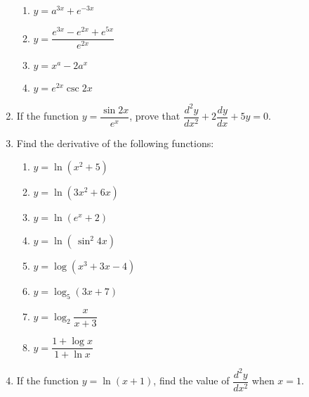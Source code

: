 \documentclass[12pt]{report}
\begin{document}
\begin{enumerate}
\begin{enumerate}
              \item $y=a^{3x}+e^{-3x}$
              \item $y={\dfrac{e^{3x}-e^{2x}+e^{5x}}{e^{2x}}}$
              \item $y=x^{a}-2a^{x}$
              \item $y=e^{2x}\csc2x$
          \end{enumerate}
    \item If the function $y = \dfrac{\sin 2x}{e^x}$, prove that $\dfrac{d^2y}{dx^2} +
              2\dfrac{dy}{dx} + 5y = 0$.
    \item Find the derivative of the following functions:
          \begin{enumerate}
              \item $y=\ln\left(x^{2}+5\right)$
              \item $y=\ln\left(3x^{2}+6x\right)$
              \item $y=\ln\left(e^{x}+2\right)$
              \item $y=\ln\left(\,\sin^{2}4x\right)$
              \item $y=\log\left(x^{3}+3x-4\right)$
              \item $y=\log_{5}\left(3x+7\right)$
              \item $y=\log_{2}{\dfrac{x}{x+3}}$
              \item $y={\dfrac{1+\log x}{1+\ln x}}$
          \end{enumerate}
    \item If the function $y = \ln(x+1)$, find the value of $\dfrac{d^2y}{dx^2}$ when $x
              = 1$.
\end{enumerate}
\end{document}
